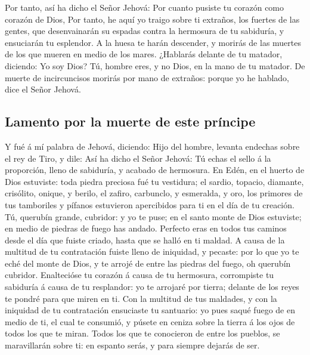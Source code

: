  Por tanto, así ha dicho el Señor Jehová: Por cuanto
pusiste tu corazón como corazón de Dios,  Por tanto, he
aquí yo traigo sobre ti extraños, los fuertes de las gentes, que
desenvainarán su espadas contra la hermosura de tu sabiduría, y
ensuciarán tu esplendor.  A la huesa te harán descender, y
morirás de las muertes de los que mueren en medio de los mares.
 ¿Hablarás delante de tu matador, diciendo: Yo soy Dios?
Tú, hombre eres, y no Dios, en la mano de tu matador.  De
muerte de incircuncisos morirás por mano de extraños: porque yo he
hablado, dice el Señor Jehová.

\hypertarget{lamento-por-la-muerte-de-este-pruxedncipe}{%
\subsection{Lamento por la muerte de este
príncipe}\label{lamento-por-la-muerte-de-este-pruxedncipe}}

 Y fué á mí palabra de Jehová, diciendo: 
Hijo del hombre, levanta endechas sobre el rey de Tiro, y dile: Así ha
dicho el Señor Jehová: Tú echas el sello á la proporción, lleno de
sabiduría, y acabado de hermosura.  En Edén, en el huerto
de Dios estuviste: toda piedra preciosa fué tu vestidura; el sardio,
topacio, diamante, crisólito, onique, y berilo, el zafiro, carbunclo, y
esmeralda, y oro, los primores de tus tamboriles y pífanos estuvieron
apercibidos para ti en el día de tu creación.  Tú,
querubín grande, cubridor: y yo te puse; en el santo monte de Dios
estuviste; en medio de piedras de fuego has andado. 
Perfecto eras en todos tus caminos desde el día que fuiste criado, hasta
que se halló en ti maldad.  A causa de la multitud de tu
contratación fuiste lleno de iniquidad, y pecaste: por lo que yo te eché
del monte de Dios, y te arrojé de entre las piedras del fuego, oh
querubín cubridor.  Enaltecióse tu corazón á causa de tu
hermosura, corrompiste tu sabiduría á causa de tu resplandor: yo te
arrojaré por tierra; delante de los reyes te pondré para que miren en
ti.  Con la multitud de tus maldades, y con la iniquidad
de tu contratación ensuciaste tu santuario: yo pues saqué fuego de en
medio de ti, el cual te consumió, y púsete en ceniza sobre la tierra á
los ojos de todos los que te miran.  Todos los que te
conocieron de entre los pueblos, se maravillarán sobre ti: en espanto
serás, y para siempre dejarás de ser.

